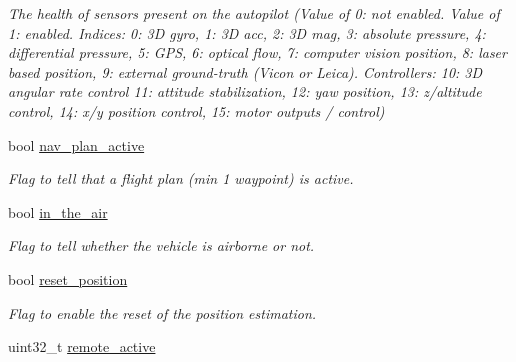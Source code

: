 \begin{DoxyCompactItemize}
\begin{DoxyCompactList}\small\item\em The health of sensors present on the autopilot (Value of 0\+: not enabled. Value of 1\+: enabled. Indices\+: 0\+: 3\+D gyro, 1\+: 3\+D acc, 2\+: 3\+D mag, 3\+: absolute pressure, 4\+: differential pressure, 5\+: G\+P\+S, 6\+: optical flow, 7\+: computer vision position, 8\+: laser based position, 9\+: external ground-\/truth (Vicon or Leica). Controllers\+: 10\+: 3\+D angular rate control 11\+: attitude stabilization, 12\+: yaw position, 13\+: z/altitude control, 14\+: x/y position control, 15\+: motor outputs / control) \end{DoxyCompactList}\item 
\hypertarget{structstate__t_ab3c8bee79461cad9d174575f0772b760}{bool \hyperlink{structstate__t_ab3c8bee79461cad9d174575f0772b760}{nav\+\_\+plan\+\_\+active}}\label{structstate__t_ab3c8bee79461cad9d174575f0772b760}

\begin{DoxyCompactList}\small\item\em Flag to tell that a flight plan (min 1 waypoint) is active. \end{DoxyCompactList}\item 
\hypertarget{structstate__t_ab5003598108643ca340fa8577ae7972d}{bool \hyperlink{structstate__t_ab5003598108643ca340fa8577ae7972d}{in\+\_\+the\+\_\+air}}\label{structstate__t_ab5003598108643ca340fa8577ae7972d}

\begin{DoxyCompactList}\small\item\em Flag to tell whether the vehicle is airborne or not. \end{DoxyCompactList}\item 
\hypertarget{structstate__t_ae900c25359dc1a2536d772ecaa2d507b}{bool \hyperlink{structstate__t_ae900c25359dc1a2536d772ecaa2d507b}{reset\+\_\+position}}\label{structstate__t_ae900c25359dc1a2536d772ecaa2d507b}

\begin{DoxyCompactList}\small\item\em Flag to enable the reset of the position estimation. \end{DoxyCompactList}\item 
\hypertarget{structstate__t_a57817e74c67b7b95d321e2759e3d34f2}{uint32\+\_\+t \hyperlink{structstate__t_a57817e74c67b7b95d321e2759e3d34f2}{remote\+\_\+active}}\label{structstate__t_a57817e74c67b7b95d321e2759e3d34f2}


\end{DoxyCompactItemize}
